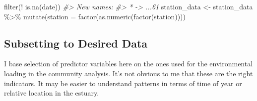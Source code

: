 \documentclass[
]{article}
\newenvironment{Shaded}{\begin{snugshade}}{\end{snugshade}}
\newcommand{\AttributeTok}[1]{\textcolor[rgb]{0.77,0.63,0.00}{#1}}
\newcommand{\CommentTok}[1]{\textcolor[rgb]{0.56,0.35,0.01}{\textit{#1}}}
\newcommand{\FunctionTok}[1]{\textcolor[rgb]{0.00,0.00,0.00}{#1}}
\newcommand{\NormalTok}[1]{#1}
\newcommand{\OtherTok}[1]{\textcolor[rgb]{0.56,0.35,0.01}{#1}}
\newcommand{\SpecialCharTok}[1]{\textcolor[rgb]{0.00,0.00,0.00}{#1}}
\begin{document}
\begin{Shaded}
\begin{Highlighting}[]
  \FunctionTok{filter}\NormalTok{(}\SpecialCharTok{!} \FunctionTok{is.na}\NormalTok{(date))}
\CommentTok{\#\textgreater{} New names:}
\CommentTok{\#\textgreater{} * \textasciigrave{}\textasciigrave{} {-}\textgreater{} ...61}
\NormalTok{station\_data }\OtherTok{\textless{}{-}}\NormalTok{ station\_data }\SpecialCharTok{\%\textgreater{}\%}
  \FunctionTok{mutate}\NormalTok{(}\AttributeTok{station =} \FunctionTok{factor}\NormalTok{(}\FunctionTok{as.numeric}\NormalTok{(}\FunctionTok{factor}\NormalTok{(station))))}
\end{Highlighting}
\end{Shaded}

\hypertarget{subsetting-to-desired-data}{%
\subsection{Subsetting to Desired
Data}\label{subsetting-to-desired-data}}

I base selection of predictor variables here on the ones used for the
environmental loading in the community analysis. It's not obvious to me
that these are the right indicators. It may be easier to understand
patterns in terms of time of year or relative location in the estuary.
\end{document}
